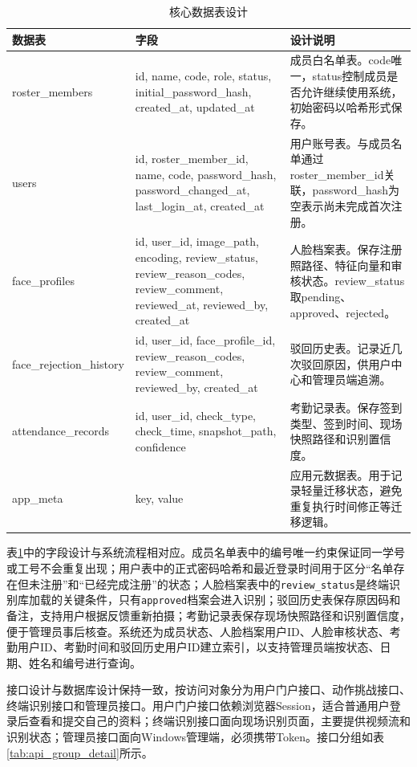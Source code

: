 \begin{table}[H]
    \centering
    \caption{核心数据表设计}
    \label{tab:data_model_detail}
    \begin{tabularx}{\textwidth}{p{3.1cm}p{4.7cm}X}
        \toprule
        \textbf{数据表} & \textbf{字段} & \textbf{设计说明} \\
        \midrule
        roster\_members & id, name, code, role, status, initial\_password\_hash, created\_at, updated\_at & 成员白名单表。code唯一，status控制成员是否允许继续使用系统，初始密码以哈希形式保存。 \\
        users & id, roster\_member\_id, name, code, password\_hash, password\_changed\_at, last\_login\_at, created\_at & 用户账号表。与成员名单通过roster\_member\_id关联，password\_hash为空表示尚未完成首次注册。 \\
        face\_profiles & id, user\_id, image\_path, encoding, review\_status, review\_reason\_codes, review\_comment, reviewed\_at, reviewed\_by, created\_at & 人脸档案表。保存注册照路径、特征向量和审核状态。review\_status取pending、approved、rejected。 \\
        face\_rejection\_history & id, user\_id, face\_profile\_id, review\_reason\_codes, review\_comment, reviewed\_by, created\_at & 驳回历史表。记录近几次驳回原因，供用户中心和管理员端追溯。 \\
        attendance\_records & id, user\_id, check\_type, check\_time, snapshot\_path, confidence & 考勤记录表。保存签到类型、签到时间、现场快照路径和识别置信度。 \\
        app\_meta & key, value & 应用元数据表。用于记录轻量迁移状态，避免重复执行时间修正等迁移逻辑。 \\
        \bottomrule
    \end{tabularx}
\end{table}

表\ref{tab:data_model_detail}中的字段设计与系统流程相对应。成员名单表中的编号唯一约束保证同一学号或工号不会重复出现；用户表中的正式密码哈希和最近登录时间用于区分“名单存在但未注册”和“已经完成注册”的状态；人脸档案表中的\texttt{review\_status}是终端识别库加载的关键条件，只有\texttt{approved}档案会进入识别；驳回历史表保存原因码和备注，支持用户根据反馈重新拍摄；考勤记录表保存现场快照路径和识别置信度，便于管理员事后核查。系统还为成员状态、人脸档案用户ID、人脸审核状态、考勤用户ID、考勤时间和驳回历史用户ID建立索引，以支持管理员端按状态、日期、姓名和编号进行查询。

接口设计与数据库设计保持一致，按访问对象分为用户门户接口、动作挑战接口、终端识别接口和管理员接口。用户门户接口依赖浏览器Session，适合普通用户登录后查看和提交自己的资料；终端识别接口面向现场识别页面，主要提供视频流和识别状态；管理员接口面向Windows管理端，必须携带Token。接口分组如表\ref{tab:api_group_detail}所示。


